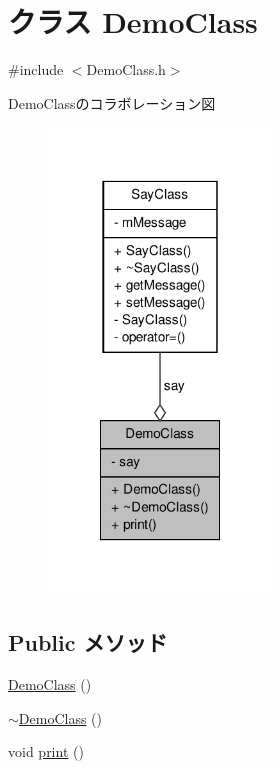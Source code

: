 \hypertarget{classDemoClass}{\section{クラス \-Demo\-Class}
\label{classDemoClass}
}


{\ttfamily \#include $<$\-Demo\-Class.\-h$>$}



\-Demo\-Classのコラボレーション図
\nopagebreak
\begin{figure}[H]
\begin{center}
\leavevmode
\includegraphics[width=168pt]{classDemoClass__coll__graph}
\end{center}
\end{figure}
\subsection*{\-Public メソッド}
\begin{DoxyCompactItemize}
\item 
\hyperlink{classDemoClass_ab232708c2e87c26b1292e55ad8a5a00f}{\-Demo\-Class} ()
\item 
\hyperlink{classDemoClass_ac22c3b34b51febc4c57e70f68c552da3}{$\sim$\-Demo\-Class} ()
\item 
void \hyperlink{classDemoClass_a6c357e6031ede08427a7cf9dc880477c}{print} ()
\end{DoxyCompactItemize}

